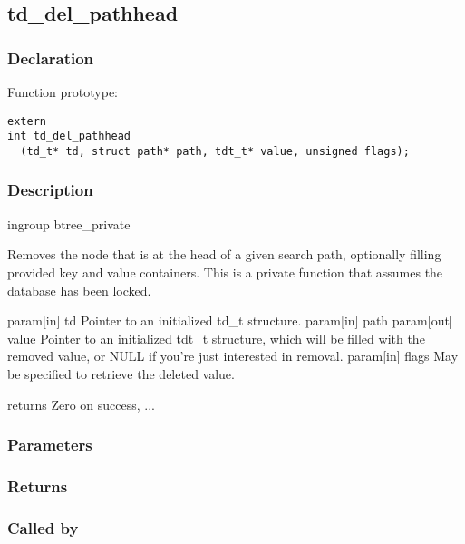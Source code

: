 
\newpage
\subsection{td\_del\_pathhead}
\subsubsection{Declaration} Function prototype:

\begin{verbatim}
extern
int td_del_pathhead
  (td_t* td, struct path* path, tdt_t* value, unsigned flags);
\end{verbatim}

\subsubsection{Description}


 ingroup btree\_private

 Removes the node that is at the head of a given search path,
 optionally filling provided key and value containers.
 This is a private function that assumes the database has been locked.

 param[in] td Pointer to an initialized td\_t structure.
 param[in] path
 param[out] value Pointer to an initialized tdt\_t structure,
 which will be filled
 with the removed value, or NULL if you're just interested in removal.
 param[in] flags May be specified to retrieve the deleted value.

 returns Zero on success, ...
 

\subsubsection{Parameters}
\subsubsection{Returns}
\subsubsection{Called by}
